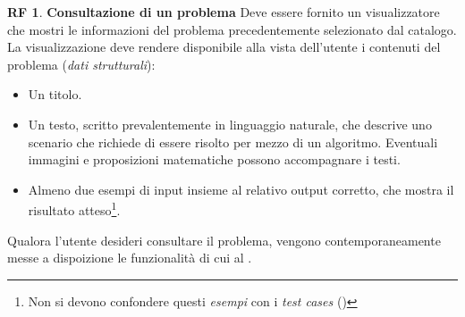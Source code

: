 \documentclass[11pt, a4paper]{article}
\theoremstyle{definition}
\newtheorem{funcreq}{RF} %
\begin{document}
\begin{funcreq}
\label{seeproblem}
\textbf{Consultazione di un problema }
Deve essere fornito un visualizzatore che mostri le informazioni del
problema precedentemente selezionato dal catalogo. La visualizzazione
deve rendere disponibile alla vista dell'utente i contenuti del
problema (\textit{dati strutturali}):
\begin{itemize}
    \item Un titolo.

    \item Un testo, scritto prevalentemente in linguaggio naturale,
    che descrive uno scenario che richiede di essere risolto per mezzo
    di un algoritmo. Eventuali immagini e proposizioni matematiche
    possono accompagnare i testi.

    \item Almeno due esempi di input insieme al relativo output corretto,
    che mostra il risultato atteso\footnote{Non si devono confondere questi \textit{esempi}
    con i \textit{test cases} (\textcolor{blue}{})}.
\end{itemize}
Qualora l'utente desideri consultare il problema, vengono contemporaneamente
messe a dispoizione le funzionalità di cui al \textcolor{blue}{}.
\end{funcreq}
\end{document}

